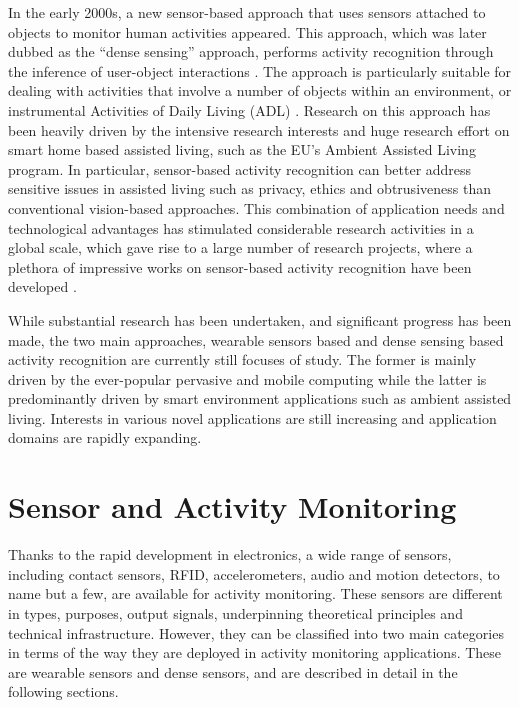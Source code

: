 In the early 2000s, a new sensor-based approach that uses sensors attached to objects to monitor human activities appeared. This approach, which was later dubbed as the “dense sensing” approach, performs activity recognition through the inference of user-object interactions \cite{Bao2004} \cite{Patterson2003}. The approach is particularly suitable for dealing with activities that involve a number of objects within an environment, or instrumental Activities of Daily Living (ADL) \cite{Chan2008} \cite{Nugent2009}. Research on this approach has been heavily driven by the intensive research interests and huge research effort on smart home based assisted living, such as the EU’s Ambient Assisted Living program. In particular, sensor-based activity recognition can better address sensitive issues in assisted living such as privacy, ethics and obtrusiveness than conventional vision-based approaches. This combination of application needs and technological advantages has stimulated considerable research activities in a global scale, which gave rise to a large number of research projects, where a plethora of impressive works on sensor-based activity recognition have been developed \cite{Kern2003}  \cite{Mantyjarvi2001} \cite{Philipose2004} \cite{Patterson2005} \cite{Buettner2009} \cite{Wren2006} \cite{Gu2009} \cite{Patterson2003} \cite{Liao2007}.

While substantial research has been undertaken, and significant progress has been made, the two main approaches, wearable sensors based and dense sensing based activity recognition are currently still focuses of study. The former is mainly driven by the ever-popular pervasive and mobile computing while the latter is predominantly driven by smart environment applications such as ambient assisted living. Interests in various novel applications are still increasing and application domains are rapidly expanding.

\section{Sensor and Activity Monitoring}
\label{sec:soa:monitoring}

Thanks to the rapid development in electronics, a wide range of sensors, including contact sensors, RFID, accelerometers, audio and motion detectors, to name but a few, are available for activity monitoring. These sensors are different in types, purposes, output signals, underpinning theoretical principles and technical infrastructure. However, they can be classified into two main categories in terms of the way they are deployed in activity monitoring applications. These are wearable sensors and dense sensors, and are described in detail in the following sections.

